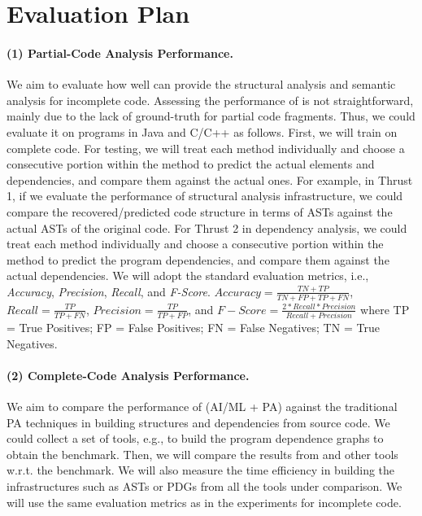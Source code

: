 \section{Evaluation Plan}
\label{eval}






\paragraph{\bf (1) Partial-Code Analysis Performance.} We aim
to evaluate how well {\tool} can provide the structural analysis and
semantic analysis for incomplete code. Assessing the performance of
\tool is not straightforward, mainly due to the lack of ground-truth
for partial code fragments. Thus, we could evaluate it on programs in
Java and C/C++ as follows.  First, we will train {\tool} on complete
code. For testing, we will treat each method individually and choose a
consecutive portion within the method to predict the actual elements
and dependencies, and compare them against the actual ones.  For
example, in Thrust 1, if we evaluate the performance of structural
analysis infrastructure, we could compare the recovered/predicted code
structure in terms of ASTs against the actual ASTs of the original
code. For Thrust 2 in dependency analysis, we could treat each method
individually and choose a consecutive portion within the method to
predict the program dependencies, and compare them against the actual
dependencies. We will adopt the standard evaluation metrics, i.e.,
\textit{Accuracy}, \textit{Precision}, \textit{Recall}, and
\textit{F-Score}. $Accuracy = \frac{TN+TP}{TN+FP+TP+FN}$, $Recall =
\frac{TP}{TP+FN}$, $Precision = \frac{TP}{TP+FP}$, and $F{-}Score =
\frac{2*Recall*Precision}{Recall+Precision}$ where TP = True
Positives; FP = False Positives; FN = False Negatives; TN = True
Negatives.

\paragraph{\bf (2) Complete-Code Analysis Performance.}
We aim to compare the performance of {\tool} (AI/ML + PA) against the
traditional PA techniques in building structures and dependencies from
source code. We could collect a set of tools, e.g., to build the
program dependence graphs to obtain the benchmark. Then, we will
compare the results from {\tool} and other tools w.r.t. the
benchmark. We will also measure the time efficiency in building the
infrastructures such as ASTs or PDGs from all the tools under
comparison. We will use the same evaluation metrics as in the
experiments for incomplete code.

